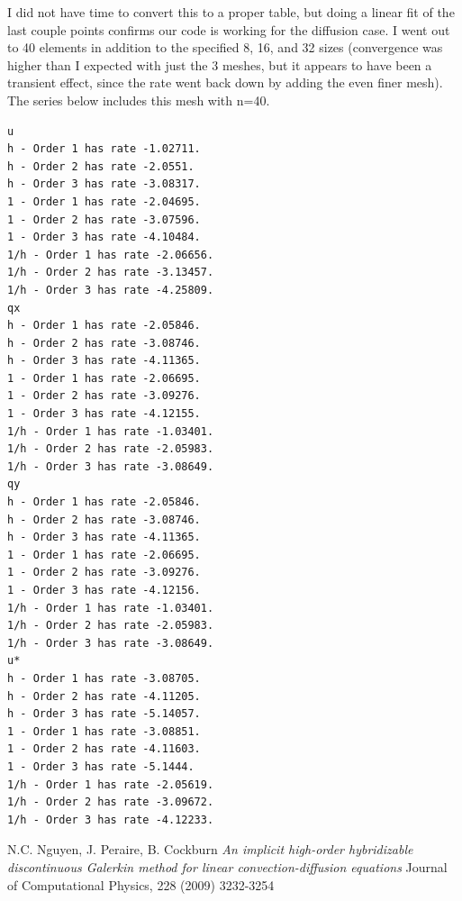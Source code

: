 \documentclass{article}
\begin{document}
I did not have time to convert this to a proper table, but doing a linear fit of the last couple points confirms our code is working for the diffusion case.
I went out to 40 elements in addition to the specified 8, 16, and 32 sizes (convergence was higher than I expected with just the 3 meshes, but it appears to have been a transient effect, since the rate went back down by adding the even finer mesh).
The series below includes this mesh with n=40.
\begin{verbatim}
u
h - Order 1 has rate -1.02711.
h - Order 2 has rate -2.0551.
h - Order 3 has rate -3.08317.
1 - Order 1 has rate -2.04695.
1 - Order 2 has rate -3.07596.
1 - Order 3 has rate -4.10484.
1/h - Order 1 has rate -2.06656.
1/h - Order 2 has rate -3.13457.
1/h - Order 3 has rate -4.25809.
qx
h - Order 1 has rate -2.05846.
h - Order 2 has rate -3.08746.
h - Order 3 has rate -4.11365.
1 - Order 1 has rate -2.06695.
1 - Order 2 has rate -3.09276.
1 - Order 3 has rate -4.12155.
1/h - Order 1 has rate -1.03401.
1/h - Order 2 has rate -2.05983.
1/h - Order 3 has rate -3.08649.
qy
h - Order 1 has rate -2.05846.
h - Order 2 has rate -3.08746.
h - Order 3 has rate -4.11365.
1 - Order 1 has rate -2.06695.
1 - Order 2 has rate -3.09276.
1 - Order 3 has rate -4.12156.
1/h - Order 1 has rate -1.03401.
1/h - Order 2 has rate -2.05983.
1/h - Order 3 has rate -3.08649.
u*
h - Order 1 has rate -3.08705.
h - Order 2 has rate -4.11205.
h - Order 3 has rate -5.14057.
1 - Order 1 has rate -3.08851.
1 - Order 2 has rate -4.11603.
1 - Order 3 has rate -5.1444.
1/h - Order 1 has rate -2.05619.
1/h - Order 2 has rate -3.09672.
1/h - Order 3 has rate -4.12233.
\end{verbatim}

\begin{thebibliography}{9}
N.C. Nguyen, J. Peraire, B. Cockburn
\textit{An implicit high-order hybridizable discontinuous Galerkin method for linear convection-diffusion equations}
Journal of Computational Physics, 228 (2009) 3232-3254
\end{thebibliography}
\end{document}
